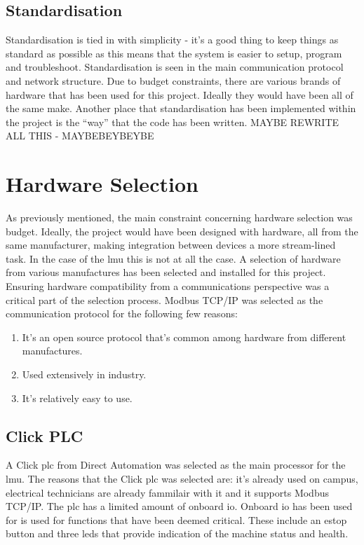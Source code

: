     \subsection{Standardisation}
        Standardisation is tied in with simplicity - it's a good thing to keep things as standard as possible as this means that the system is easier to setup, program and troubleshoot. Standardisation is seen in the main communication protocol and network structure. Due to budget constraints,  there are various brands of hardware that has been used for this project. Ideally they would have been all of the same make. Another place that standardisation has been implemented within the project is the “way” that the code has been written. MAYBE REWRITE ALL THIS - MAYBEBEYBEYBE
    
    
        
    \section {Hardware Selection}
        As previously mentioned, the main constraint concerning hardware selection was budget. Ideally, the project would have been designed with hardware, all from the same manufacturer, making integration between devices a more stream-lined task. In the case of the \acrshort{lmu} this is not at all the case. A selection of hardware from various manufactures has been selected and installed for this project. Ensuring hardware compatibility from a communications perspective was a critical part of the selection process. Modbus TCP/IP was selected as the communication protocol for the following few reasons:
        \begin{enumerate}
            \item It's an open source protocol that's common among hardware from different manufactures.
            \item Used extensively in industry.
            \item It's relatively easy to use.
        \end{enumerate}
    
        
    
    \subsection{Click PLC}
        A Click \acrshort{plc} from Direct Automation was selected as the main processor for the \acrshort{lmu}. The reasons that the Click \acrshort{plc} was selected are: it's already used on campus, electrical technicians are already fammilair with it and it supports Modbus TCP/IP. The \acrshort{plc} has a limited amount of onboard \acrshort{io}. Onboard \acrshort{io} has been used for is used for functions that have been deemed critical. These include an \acrshort{estop} button and three \acrshort{led}s that provide indication of the machine status and health.
    
